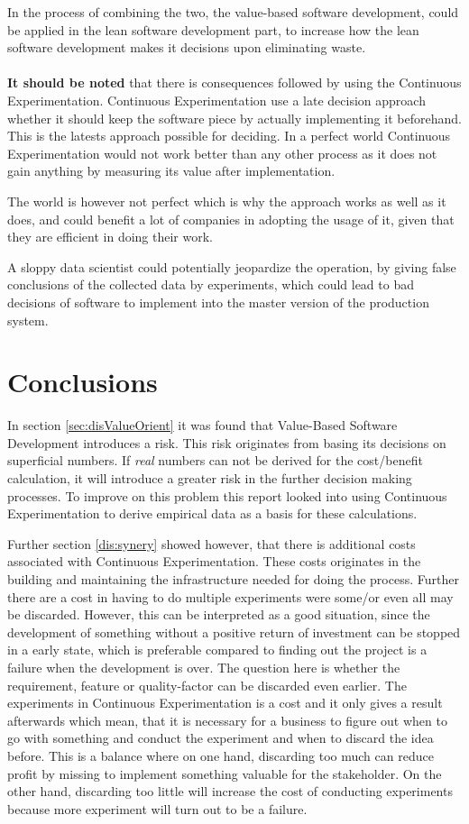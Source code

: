 \documentclass{sig-alternate}
\begin{document}
In the process of combining the two, the value-based software development, could be applied in the lean
software development part, to increase how the lean software development makes it decisions upon eliminating 
waste.
\\
\\
\textbf{It should be noted} that there is consequences followed by using the Continuous Experimentation. 
Continuous Experimentation use a late decision approach whether it should keep the software piece by 
actually implementing it beforehand. 
This is the latests approach possible for deciding. In a perfect world Continuous Experimentation would not
work better than any other process as it does not gain anything by measuring its value after implementation.

The world is however not perfect which is why the approach works as well as it does, and could benefit 
a lot of companies in adopting the usage of it, given that they are efficient in doing their work. 

A sloppy data scientist could potentially jeopardize the operation, by giving false conclusions of the 
collected data by experiments, which could lead to bad decisions of software to implement into the master
version of the production system.

\section{Conclusions}

In section \ref{sec:disValueOrient} it was found that Value-Based Software Development introduces a risk. This risk originates from basing its decisions on superficial numbers. If \textit{real} numbers can not be derived for the cost/benefit calculation, it will introduce a greater risk in the further decision making processes. To improve on this problem this report looked into using Continuous Experimentation to derive empirical data as a basis for these calculations. 


Further section \ref{dis:synery} showed however, that there is additional costs associated with Continuous Experimentation. These costs originates in the building and maintaining the infrastructure needed for doing the process. Further there are a cost in having to do multiple experiments were some/or even all may be discarded. However, this can be interpreted as a good situation, since the development of something without a positive return of investment can be stopped in a early state, which is preferable compared to finding out the project is a failure when the development is over. The question here is whether the requirement, feature or quality-factor can be discarded even earlier. The experiments in Continuous Experimentation is a cost and it only gives a result afterwards which mean, that it is necessary for a business to figure out when to go with something and conduct the experiment and when to discard the idea before. This is a balance where on one hand, discarding too much can reduce profit by missing to implement something valuable for the stakeholder. On the other hand, discarding too little will increase the cost of conducting experiments because more experiment will turn out to be a failure. 
\end{document}
